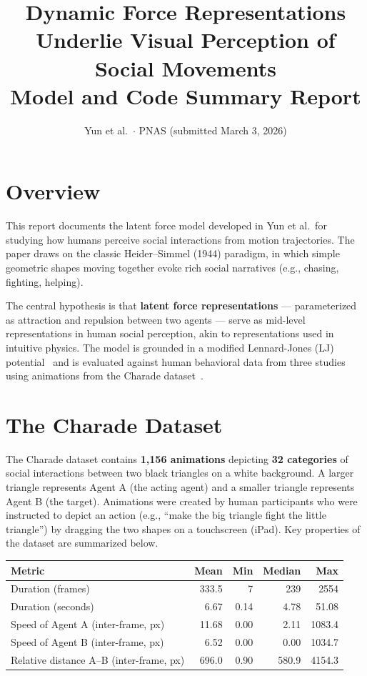 \documentclass[11pt,a4paper]{article}
\title{\textbf{Dynamic Force Representations Underlie Visual Perception of Social Movements}\\[6pt]
\large Model and Code Summary Report}
\author{Yun et al.\ $\cdot$ PNAS (submitted March 3, 2026)}
\date{}
\begin{document}
\maketitle
\tableofcontents
\newpage

\section{Overview}

This report documents the latent force model developed in Yun et al.\ for studying how humans perceive social interactions from motion trajectories. The paper draws on the classic Heider--Simmel (1944) paradigm, in which simple geometric shapes moving together evoke rich social narratives (e.g., chasing, fighting, helping).

The central hypothesis is that \textbf{latent force representations} --- parameterized as attraction and repulsion between two agents --- serve as mid-level representations in human social perception, akin to representations used in intuitive physics. The model is grounded in a modified Lennard-Jones (LJ) potential~\cite{lennardjones1925} and is evaluated against human behavioral data from three studies using animations from the Charade dataset~\cite{roemmele2016}.

\section{The Charade Dataset}

The Charade dataset contains \textbf{1,156 animations} depicting \textbf{32 categories} of social interactions between two black triangles on a white background. A larger triangle represents Agent A (the acting agent) and a smaller triangle represents Agent B (the target). Animations were created by human participants who were instructed to depict an action (e.g., ``make the big triangle fight the little triangle'') by dragging the two shapes on a touchscreen (iPad). Key properties of the dataset are summarized below.

\begin{center}
\renewcommand{\arraystretch}{1.3}
\begin{tabular}{lrrrr}
\toprule
\textbf{Metric} & \textbf{Mean} & \textbf{Min} & \textbf{Median} & \textbf{Max} \\
\midrule
Duration (frames) & 333.5 & 7 & 239 & 2554 \\
Duration (seconds) & 6.67 & 0.14 & 4.78 & 51.08 \\
Speed of Agent A (inter-frame, px) & 11.68 & 0.00 & 2.11 & 1083.4 \\
Speed of Agent B (inter-frame, px) & 6.52 & 0.00 & 0.00 & 1034.7 \\
Relative distance A--B (inter-frame, px) & 696.0 & 0.90 & 580.9 & 4154.3 \\
\bottomrule
\end{tabular}
\end{center}
\end{document}
